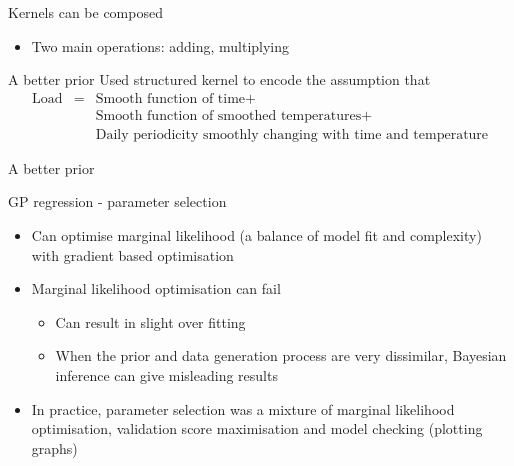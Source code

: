 \begin{frame}{Kernels can be composed}
  \begin{itemize} 
	\item Two main operations: adding, multiplying
  \end{itemize}
  
\end{frame}

\begin{frame}{A better prior}
  Used structured kernel to encode the assumption that
  \begin{eqnarray*}
    \textrm{Load} & = & \textrm{Smooth function of time} +  \\
    & & \textrm{Smooth function of smoothed temperatures} + \\
    & & \textrm{Daily periodicity smoothly changing with time and temperature}
  \end{eqnarray*}
  \begin{center}
    
  \end{center}
\end{frame}

\begin{frame}{A better prior}
  \begin{center}
    
  \end{center}
\end{frame}

\begin{frame}{GP regression - parameter selection}
  \begin{itemize}
    \item Can optimise marginal likelihood (a balance of model fit and complexity) with gradient based optimisation
    \vspace{\baselineskip}
    \item Marginal likelihood optimisation can fail
    \begin{itemize}
      \item Can result in slight over fitting
      \item When the prior and data generation process are very dissimilar, Bayesian inference can give misleading results
    \end{itemize}
    \vspace{\baselineskip}
    \item In practice, parameter selection was a mixture of marginal likelihood optimisation, validation score maximisation and model checking (plotting graphs)
  \end{itemize}
\end{frame}

